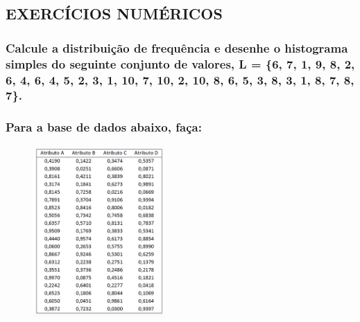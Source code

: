 \documentclass{article}
\begin{document}
\subsection{EXERCÍCIOS NUMÉRICOS}
\subsubsection{Calcule a distribuição de frequência e desenhe o histograma simples do seguinte conjunto de valores, L = \{6, 7, 1, 9, 8, 2, 6, 4, 6, 4, 5, 2, 3, 1, 10, 7, 10, 2, 10, 8, 6, 5, 3, 8,
3, 1, 8, 7, 8, 7\}.}
\subsubsection{Para a base de dados abaixo, faça:}

\begin{figure}[H]
  \centering 
  \includegraphics[width=5cm]{tabela.png} 
\end{figure}
\end{document}
